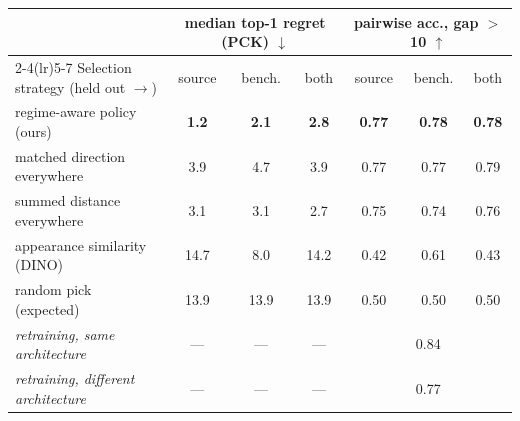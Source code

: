 \begin{tabular}{l ccc ccc}
\toprule
 & \multicolumn{3}{c}{median top-1 regret (PCK) $\downarrow$} & \multicolumn{3}{c}{pairwise acc., gap $>$10 $\uparrow$} \\
\cmidrule(lr){2-4}\cmidrule(lr){5-7}
Selection strategy \hfill (held out $\rightarrow$) & source & bench. & both & source & bench. & both \\
\midrule
regime-aware policy (ours) & \textbf{1.2} & \textbf{2.1} & \textbf{2.8} & \textbf{0.77} & \textbf{0.78} & \textbf{0.78} \\
matched direction everywhere & 3.9 & 4.7 & 3.9 & 0.77 & 0.77 & 0.79 \\
summed distance everywhere & 3.1 & 3.1 & 2.7 & 0.75 & 0.74 & 0.76 \\
appearance similarity (DINO) & 14.7 & 8.0 & 14.2 & 0.42 & 0.61 & 0.43 \\
random pick (expected) & 13.9 & 13.9 & 13.9 & 0.50 & 0.50 & 0.50 \\
\midrule
\emph{retraining, same architecture} & --- & --- & --- & \multicolumn{3}{c}{0.84} \\
\emph{retraining, different architecture} & --- & --- & --- & \multicolumn{3}{c}{0.77} \\
\bottomrule
\end{tabular}
